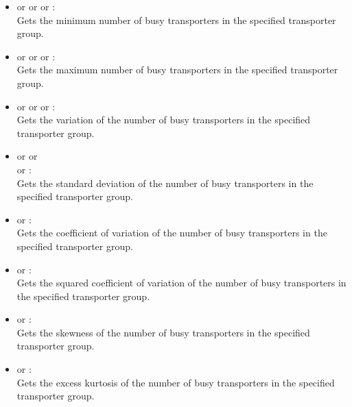 \begin{itemize}
\item
{} or  or  or :\\
Gets the minimum number of busy transporters in the specified transporter group.
  
\item
{} or  or  or :\\
Gets the maximum number of busy transporters in the specified transporter group.
  
\item
{} or  or  or :\\
Gets the variation of the number of busy transporters in the specified transporter group.
  
\item
{} or  or\\
 or :\\
Gets the standard deviation of the number of busy transporters in the specified transporter group.
  
\item
{} or :\\
Gets the coefficient of variation of the number of busy transporters in the specified transporter group.
  
\item
{} or :\\
Gets the squared coefficient of variation of the number of busy transporters in the specified transporter group.

\item
{} or :\\
Gets the skewness of the number of busy transporters in the specified transporter group.

\item
{} or :\\
Gets the excess kurtosis of the number of busy transporters in the specified transporter group.


\end{itemize}
